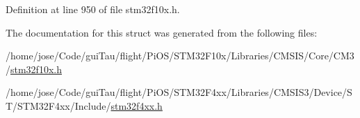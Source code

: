 Definition at line 950 of file stm32f10x.\-h.



The documentation for this struct was generated from the following files\-:\begin{DoxyCompactItemize}
\item 
/home/jose/\-Code/gui\-Tau/flight/\-Pi\-O\-S/\-S\-T\-M32\-F10x/\-Libraries/\-C\-M\-S\-I\-S/\-Core/\-C\-M3/\hyperlink{stm32f10x_8h}{stm32f10x.\-h}\item 
/home/jose/\-Code/gui\-Tau/flight/\-Pi\-O\-S/\-S\-T\-M32\-F4xx/\-Libraries/\-C\-M\-S\-I\-S3/\-Device/\-S\-T/\-S\-T\-M32\-F4xx/\-Include/\hyperlink{stm32f4xx_8h}{stm32f4xx.\-h}\end{DoxyCompactItemize}
